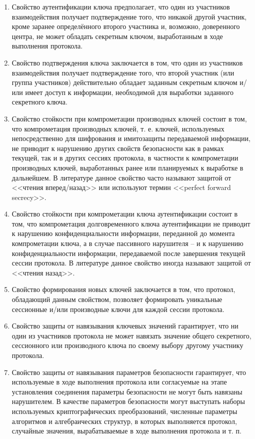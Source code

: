 \begin{enumerate}
	\item Свойство аутентификации ключа предполагает, что один из участников взаимодействия получает подтверждение того, что никакой другой участник, кроме заранее определённого второго участника и, возможно, доверенного центра, не может обладать секретным ключом, выработанным в ходе выполнения протокола.
	
	\item Свойство подтверждения ключа заключается в том, что один из участников взаимодействия получает подтверждение того, что второй участник (или группа участников) действительно обладает заданным секретным ключом и/или имеет доступ к информации, необходимой для выработки заданного секретного ключа.
	
	\item Свойство стойкости при компрометации производных ключей состоит в том, что компрометация производных ключей, т. е. ключей, используемых непосредственно для шифрования и имитозащиты передаваемой информации, не приводит к нарушению других свойств безопасности как в рамках текущей, так и в других сессиях протокола, в частности к компрометации производных ключей, выработанных ранее или планируемых к выработке в дальнейшем. В литературе данное свойство часто называют защитой от <<чтения вперед/назад>> или используют термин <<perfect forward secrecy>>.
	
	\item Свойство стойкости при компрометации ключа аутентификации состоит в том, что компрометация долговременного ключа аутентификации не приводит к нарушению конфиденциальности информации, переданной до момента компрометации ключа, а в случае пассивного нарушителя -- и к нарушению конфиденциальности информации, передаваемой после завершения текущей сессии протокола. В литературе данное свойство иногда называют защитой от <<чтения назад>>.
	
	\item Свойство формирования новых ключей заключается в том, что протокол, обладающий данным свойством, позволяет формировать уникальные сессионные и/или производные ключи для каждой сессии протокола.
	
	\item Свойство защиты от навязывания ключевых значений гарантирует, что ни один из участников протокола не может навязать значение общего секретного, сессионного или производного ключа по своему выбору другому участнику протокола.
	
	\item Свойство защиты от навязывания параметров безопасности гарантирует, что используемые в ходе выполнения протокола или согласуемые на этапе установления соединения параметры безопасности не могут быть навязаны нарушителем. В качестве параметров безопасности могут выступать наборы используемых криптографических преобразований, численные параметры алгоритмов и алгебраических структур, в которых выполняется протокол, случайные значения, вырабатываемые в ходе выполнения протокола и т. п.
	

\end{enumerate}
